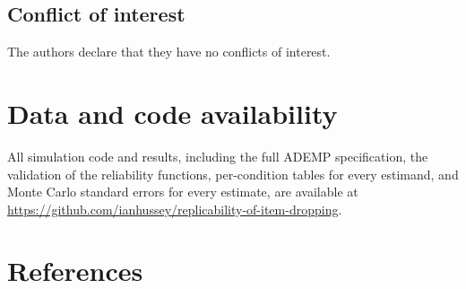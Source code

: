 \documentclass[
  nonatbib,
  authoryear,
  preprint]{elsarticle}
\begin{document}
\subsection*{Conflict of interest}\label{conflict-of-interest}

The authors declare that they have no conflicts of interest.

\section*{Data and code availability}\label{data-and-code-availability}

All simulation code and results, including the full ADEMP specification,
the validation of the reliability functions, per-condition tables for
every estimand, and Monte Carlo standard errors for every estimate, are
available at
\url{https://github.com/ianhussey/replicability-of-item-dropping}.

\section*{References}\label{references}
\end{document}

